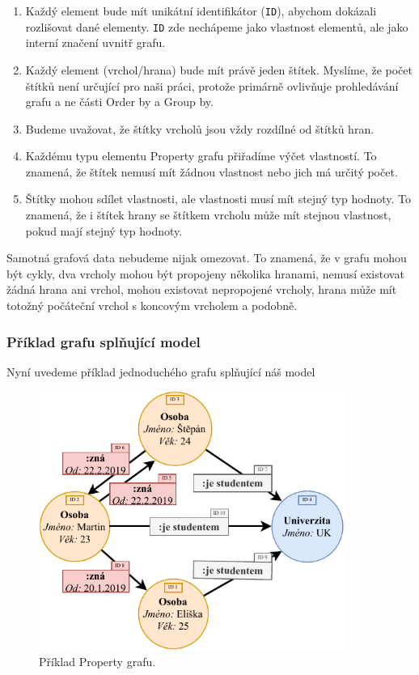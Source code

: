\begin{enumerate}

\item
Každý element bude mít unikátní identifikátor (\texttt{ID}), abychom dokázali rozlišovat dané elementy.
\texttt{ID} zde nechápeme jako vlastnost elementů, ale jako interní značení uvnitř grafu.

\item
Každý element (vrchol/hrana) bude mít právě jeden štítek.
Myslíme, že počet štítků není určující pro naši práci, protože primárně ovlivňuje prohledávání grafu a ne části Order by a Group by.

\item
Budeme uvažovat, že štítky vrcholů jsou vždy rozdílné od štítků hran.

\item
Každému typu elementu Property grafu přiřadíme výčet vlastností.
To znamená, že štítek nemusí mít žádnou vlastnost nebo jich má určitý počet.

\item
Štítky mohou sdílet vlastnosti, ale vlastnosti musí mít stejný typ hodnoty.
To znamená, že i štítek hrany se štítkem vrcholu může mít stejnou vlastnost, pokud mají stejný typ hodnoty.

\end{enumerate}

Samotná grafová data nebudeme nijak omezovat.
To znamená, že v grafu mohou být cykly, dva vrcholy mohou být propojeny několika hranami, nemusí existovat žádná hrana ani vrchol, mohou existovat nepropojené vrcholy, hrana může mít totožný počáteční vrchol s koncovým vrcholem a podobně.

\subsubsection{Příklad grafu splňující model}
Nyní uvedeme příklad jednoduchého grafu splňující náš model

\begin{figure}[!htp]
\includegraphics[width=100mm]{../img/propertyexample.pdf}\centering
\caption{Příklad Property grafu.}
\label{figure.propertygraphexample}
\end{figure}

